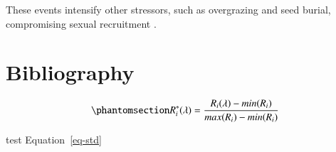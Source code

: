 \documentclass[
  number]{elsarticle}
\begin{document}
These events intensify other stressors, such as overgrazing and seed
burial, compromising sexual recruitment \citep{guerrero2020heat}.

\section{Bibliography}\label{bibliography}

\begin{equation}\phantomsection\label{eq-std}{
R_{i}^{*}(\lambda) = \frac{R_{i}(\lambda) - min(R_{i})}{max(R_{i})- min(R_{i})}
}\end{equation}

test Equation~\ref{eq-std}


  
\end{document}
